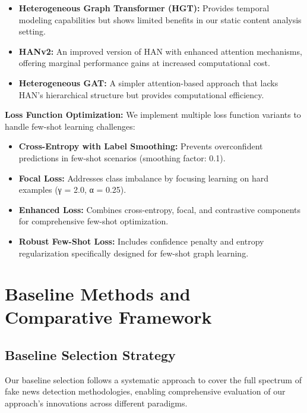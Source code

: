 \begin{itemize}
\item \textbf{Heterogeneous Graph Transformer (HGT):} Provides temporal modeling capabilities but shows limited benefits in our static content analysis setting.

\item \textbf{HANv2:} An improved version of HAN with enhanced attention mechanisms, offering marginal performance gains at increased computational cost.

\item \textbf{Heterogeneous GAT:} A simpler attention-based approach that lacks HAN's hierarchical structure but provides computational efficiency.
\end{itemize}

\textbf{Loss Function Optimization:} We implement multiple loss function variants to handle few-shot learning challenges:

\begin{itemize}
\item \textbf{Cross-Entropy with Label Smoothing:} Prevents overconfident predictions in few-shot scenarios (smoothing factor: 0.1).

\item \textbf{Focal Loss:} Addresses class imbalance by focusing learning on hard examples (γ = 2.0, α = 0.25).

\item \textbf{Enhanced Loss:} Combines cross-entropy, focal, and contrastive components for comprehensive few-shot optimization.

\item \textbf{Robust Few-Shot Loss:} Includes confidence penalty and entropy regularization specifically designed for few-shot graph learning.
\end{itemize}

\section{Baseline Methods and Comparative Framework}

\subsection{Baseline Selection Strategy}

Our baseline selection follows a systematic approach to cover the full spectrum of fake news detection methodologies, enabling comprehensive evaluation of our approach's innovations across different paradigms.

